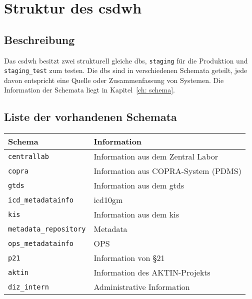  \chapter{Struktur des \acs{csdwh}} \label{ch:strcsdwh} 
 
    \section{Beschreibung}
    
    Das \ac{csdwh} besitzt zwei strukturell gleiche \acp{db}, \texttt{staging} für die Produktion und \texttt{staging\_test} zum testen. Die \acp{db} sind in verschiedenen Schemata geteilt, jede davon entspricht eine Quelle oder Zusammenfassung von Systemen. Die Information der Schemata liegt in Kapitel~\ref{ch: schema}.
    
    \section{Liste der vorhandenen Schemata}
    
    \begin{center}
    	\begin{tabular}{|| l | p{8cm} ||} 
    		\hline
    		Schema & Information \\ 
    		\hline\hline
    		\texttt{centrallab} & Information aus dem Zentral Labor \\ 
    		\hline
    		\texttt{copra} & Information aus COPRA-System (PDMS) \\
    		\hline
    		\texttt{gtds} & Information aus dem \ac{gtds}  \\
    		\hline
    		\texttt{icd\_metadatainfo} & \ac{icd10gm}  \\
    		\hline
    		\texttt{kis} & Information aus dem \ac{kis}  \\
    		\hline
        	\texttt{metadata\_repository} & Metadata \\
        	\hline 
        	\texttt{ops\_metadatainfo} & OPS  \\
        	\hline
        	\texttt{p21} & Information von \S 21  \\ 
        	\hline
        	\texttt{aktin} & Information des AKTIN-Projekts\\
        	\hline
        	\texttt{diz\_intern} & Administrative Information\\
        	\hline
    	\end{tabular}
    \end{center}